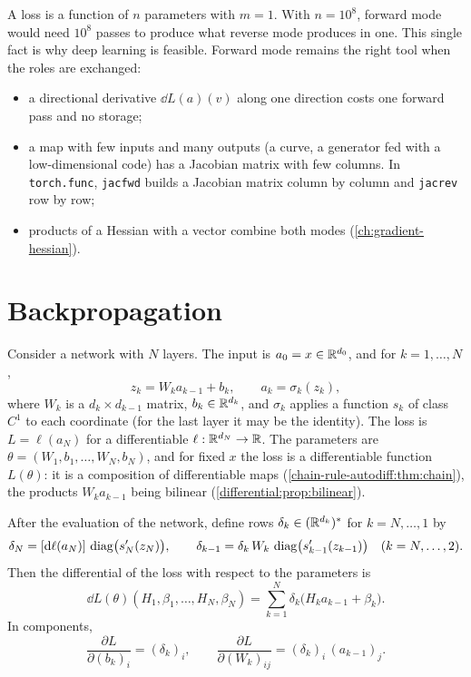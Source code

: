 \begin{notechapter}
\begin{mlthread}
A loss is a function of $n$ parameters with $m = 1$. With $n = 10^8$,
forward mode would need $10^8$ passes to produce what reverse mode
produces in one. This single fact is why deep learning is feasible.
Forward mode remains the right tool when the roles are exchanged:
\begin{itemize}[nosep]
  \item a directional derivative $\dd L(a)(v)$ along one direction costs
        one forward pass and no storage;
  \item a map with few inputs and many outputs (a curve, a generator fed
        with a low-dimensional code) has a Jacobian matrix with few
        columns. In \texttt{torch.func}, \texttt{jacfwd} builds a Jacobian
        matrix column by column and \texttt{jacrev} row by row;
  \item products of a Hessian with a vector combine both modes
        (\cref{ch:gradient-hessian}).
\end{itemize}
\end{mlthread}

\section{Backpropagation}\label{chain-rule-autodiff:sec:backprop}

Consider a network with $N$ layers. The input is $a_0 = x\in\mathbb{R}^{d_0}$,
and for $k = 1,\dots,N$,
\[
  z_k = W_ka_{k-1} + b_k, \qquad a_k = \sigma_k(z_k),
\]
where $W_k$ is a $d_k\times d_{k-1}$ matrix, $b_k\in\mathbb{R}^{d_k}$, and
$\sigma_k$ applies a function $s_k$ of class $C^1$ to each coordinate (for
the last layer it may be the identity). The loss is
$L = \ell(a_N)$ for a differentiable $\ell:\mathbb{R}^{d_N}\to\mathbb{R}$. The parameters
are $\theta = (W_1, b_1,\dots,W_N, b_N)$, and for fixed $x$ the loss is a
differentiable function $L(\theta)$: it is a composition of
differentiable maps (\cref{chain-rule-autodiff:thm:chain}), the products
$W_ka_{k-1}$ being bilinear (\cref{differential:prop:bilinear}).

\begin{theorem}[Backpropagation]\label{chain-rule-autodiff:thm:backprop}
After the evaluation of the network, define rows
$\delta_k\in(\mathbb{R}^{d_k})^*$ for $k = N,\dots,1$ by
\[
  \delta_N = [\mathrm{d}\ell(a_N)]\,\operatorname{diag}\bigl(s_N'(z_N)\bigr),
  \qquad
  \delta_{k-1} = \delta_k\,W_k\,\operatorname{diag}\bigl(s_{k-1}'(z_{k-1})\bigr)
  \quad (k = N,\dots,2) .
\]
Then the differential of the loss with respect to the parameters is
\[
  \dd L(\theta)(H_1, \beta_1,\dots,H_N, \beta_N)
  = \sum_{k=1}^N\delta_k\bigl(H_ka_{k-1} + \beta_k\bigr) .
\]
In components,
\[
  \frac{\partial L}{\partial(b_k)_i} = (\delta_k)_i ,
  \qquad
  \frac{\partial L}{\partial(W_k)_{ij}} = (\delta_k)_i\,(a_{k-1})_j .
\]
\end{theorem}


\end{notechapter}
